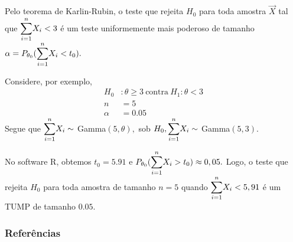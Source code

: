 \documentclass[12pt]{beamer}
\begin{document}
\begin{frame}{}
\begin{block}{}
\justifying
Pelo teorema de Karlin-Rubin, o teste que rejeita $H_{0}$ para toda amostra $\Vec{X}$ tal que ${\displaystyle \sum_{i=1}^{n}} X_{i}<3$ é um teste uniformemente mais poderoso de tamanho $\alpha=P_{\theta_{0}}({\displaystyle \sum_{i=1}^{n}} X_{i}<t_{0}).$
\end{block}
\pause
\begin{block}{}
\justifying
Considere, por exemplo, 
\begin{align*}
    H_{0}&:\theta\geq 3~\text{contra}~H_{1}:\theta< 3\\
    n&=5\\
    \alpha&=0.05
\end{align*}
Segue que ${\displaystyle \sum_{i=1}^{n}} X_{i}\sim~$Gamma$(5,\theta),$ sob $H_{0}, {\displaystyle \sum_{i=1}^{n}} X_{i}\sim~$Gamma$(5,3).$
\end{block}
\end{frame}

\begin{frame}{}
\begin{block}{}
    No software R, obtemos $t_{0}=5.91$ e $P_{\theta_{0}}({\displaystyle \sum_{i=1}^{n}} X_{i}>t_{0})\approx 0,05.$ Logo, o teste que rejeita $H_{0}$ para toda amostra de tamanho $n=5$ quando ${\displaystyle \sum_{i=1}^{n}} X_{i}<5,91$ é um TUMP de tamanho $0.05.$ 
\end{block}
\nocite{hogg, casella2021statistical}
\end{frame}


%

\begin{frame}[allowframebreaks]
\frametitle{\bf Referências}
\printbibliography
\end{frame}
\end{document}
